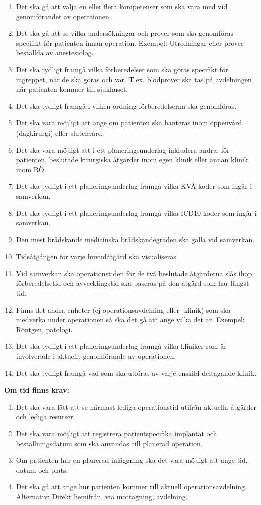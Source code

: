 \documentclass{article}
\begin{document}
\begin{enumerate}
\item Det ska gå att välja en eller flera kompetenser som ska vara med vid
genomförandet av operationen.
\item Det ska gå att se vilka undersökningar och prover som ska genomföras
specifikt för patienten innan operation. Exempel: Utredningar eller prover
beställda av anestesiolog.
\item Det ska tydligt framgå vilka förberedelser som ska göras specifikt för
ingreppet, när de ska göras och var. T.ex. blodprover ska tas på avdelningen
när patienten kommer till sjukhuset.
\item Det ska tydligt framgå i vilken ordning förberedelserna ska genomföras.
\item Det ska vara möjligt att ange om patienten ska hanteras inom öppenvård
(dagkirurgi) eller slutenvård.
\item Det ska vara möjligt att i ett planeringsunderlag inkludera andra, för
patienten, beslutade kirurgiska åtgärder inom egen klinik eller annan klinik
inom RÖ.
\item Det ska tydligt i ett planeringsunderlag framgå vilka KVÅ-koder som ingår
i samverkan.
\item Det ska tydligt i ett planeringsunderlag framgå vilka ICD10-koder som
ingår i samverkan.
\item Den mest brådskande medicinska brådskandegraden ska gälla vid samverkan.
\item Tidsåtgången för varje huvudåtgärd ska visualiseras.
\item Vid samverkan ska operationstiden för de två beslutade åtgärderna slås
ihop, förberedelsetid och avvecklingstid ska baseras på den åtgärd som har
längst tid.
\item Finns det andra enheter (ej operationsavdelning eller -klinik) som ska
medverka under operationen så ska det gå att ange vilka det är.
Exempel: Röntgen, patologi.
\item Det ska tydligt i ett planeringsunderlag framgå vilka kliniker som är
involverade i aktuellt genomförande av operationen.
\item Det ska tydligt framgå vad som ska utföras av varje enskild deltagande
klinik.
\end{enumerate}
\textbf{Om tid finns krav:}
\begin{enumerate}
  \item Det ska vara lätt att se närmast lediga operationstid utifrån aktuella
  åtgärder och lediga resurser.
  \item Det ska vara möjligt att registrera patientspecifika implantat och
  beställningsdatum som ska användas till planerad operation.
  \item Om patienten har en planerad inläggning ska det vara möjligt att ange
  tid, datum och plats.
  \item Det ska gå att ange hur patienten kommer till aktuell
  operationsavdelning. Alternativ: Direkt hemifrån, via mottagning, avdelning.
\end{enumerate}
\end{document}
